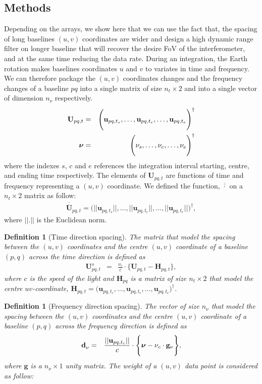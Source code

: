 \documentclass[useAMS,usenatbib]{mn2e}
\newtheorem{definition}[theorem]{Definition}
\begin{document}
\subsection{Methods}
\label{sec:baseline1}
Depending on the arrays, we show
here that we can use the fact that, the spacing of long baselines $(u,v)$ coordinates are wider and  
design a high dynamic range filter on longer baseline that will recover the desire FoV of the interferometer, and at the same time 
reducing the data rate. During an integration, the Earth rotation makes baselines coordinates $u$ and $v$  to variates in time and 
frequency. We can therefore package the $(u,v)$ coordinates changes and the frequency changes of a baseline $pq$ into a single matrix of 
size $n_t \times 2$ and  into a single vector of dimension $n_{\nu}$ respectively. 
\begin{eqnarray*}
\mathbf{U}_{pq,t}&=& \Bigg(\mathbf{u}_{pq,t_s}, \dots , \mathbf{u}_{pq,t_c}, \dots, \mathbf{u}_{pq,t_e}\Bigg)^{\dagger}\\
 \mbox{\boldmath $\nu$}&=&\Bigg(\nu_s,\dots,\nu_c,\dots,\nu_e\Bigg)^{\dagger}
\end{eqnarray*}
where the indexes $s$, $c$ and $e$ references the integration interval starting, centre, and ending time respectively. 
The 
elements of $\mathbf{U}_{pq,t}$ are functions of time and frequency representing a $(u,v)$ coordinate.
We defined the function, $\overline{\overline{\cdot}}$ on a $n_t \times 2$ matrix as follow:
\begin{eqnarray}
\overline{\overline{\mathbf{U}}}_{pq,t}=\Bigg(||\mathbf{u}_{pq,t_s}||, \dots , ||\mathbf{u}_{pq,t_c}||, \dots, 
||\mathbf{u}_{pq,t_e}||\Bigg)^{\dagger},
\end{eqnarray}
where $||.||$ is the Euclidean norm.
\begin{definition}[Time direction spacing]
\label{def:1}
The matrix that model the spacing between the $(u,v)$ coordinates and the centre $(u,v)$ coordinate of a baseline $(p,q)$ across the time 
direction is defined as
\begin{eqnarray*}
 \mathbf{U}_{pq,t}^{s} &=&\frac{\nu_c}{c}\cdot\Bigg\{\mathbf{U}_{pq,t}-\mathbf{H}_{pq,t} \Bigg \},
\end{eqnarray*}
where $c$ is the speed of the light and $\mathbf{H}_{pq}$ is a matrix of size $n_t \times 2$ that model the centre $uv$-coordinate,
$\mathbf{H}_{pq,t}= \big(\mathbf{u}_{pq,t_c}, \dots , \mathbf{u}_{pq,t_c}, \dots, \mathbf{u}_{pq,t_c}\big)^{\dagger}$.
\end{definition}
\begin{definition}[Frequency direction spacing]
\label{def:2}
The vector of size $n_{\nu}$ that model the spacing between the $(u,v)$ coordinates and the centre $(u,v)$ coordinate of a baseline $(p,q)$ 
across the frequency direction is defined as
\begin{eqnarray*}
\mathbf{d}^{}_{\nu} &=&\frac{||\textbf{u}_{pq,t_c}||}{c}\cdot\Bigg\{\mbox{\boldmath 
$\nu$}-\nu_c\cdot\mathbf{g}_{\nu} \Bigg \},
\end{eqnarray*}
where  $\textbf{g}$ is a $n_{\nu}\times1$ unity matrix. The weight of a $(u,v)$ data point is considered as follow:
\end{definition}
\end{document}

